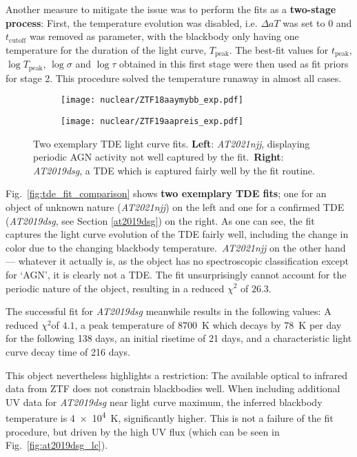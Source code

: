Another measure to mitigate the issue was to perform the fits as a \textbf{two-stage process}: First, the temperature evolution was disabled, i.e. $\Delta aT$ was set to $0$ and $t_\text{cutoff}$ was removed as parameter, with the blackbody only having one temperature for the duration of the light curve, $T_\text{peak}$. The best-fit values for $t_\text{peak}$, $\log T­­_\text{peak}$, $\log \sigma$ and $\log \tau$ obtained in this first stage were then used as fit priors for stage 2. This procedure solved the temperature runaway in almost all cases.

\begin{figure}[htb]
    \centering
    \begin{subfigure}[b]{0.49\textwidth}
        \centering
        \texttt{[image: nuclear/ZTF18aaymybb\_exp.pdf]}
    \end{subfigure}
    \begin{subfigure}[b]{0.49\textwidth}
        \centering
        \texttt{[image: nuclear/ZTF19aapreis\_exp.pdf]}
    \end{subfigure}
    \caption[Two exemplary TDE fits]{Two exemplary TDE light curve fits. \textbf{Left}: \textit{AT2021njj}, displaying periodic AGN activity not well captured by the fit.\ \textbf{Right}: \textit{AT2019dsg}, a TDE which is captured fairly well by the fit routine.}
\end{figure}

Fig.~\ref{fig:tde_fit_comparison} shows \textbf{two exemplary TDE fits}; one for an object of unknown nature (\textit{AT2021njj}) on the left and one for a confirmed TDE (\textit{AT2019dsg}, see Section \ref{at2019dsg}) on the right. As one can see, the fit captures the light curve evolution of the TDE fairly well, including the change in color due to the changing blackbody temperature.~\textit{AT2021njj} on the other hand --- whatever it actually is, as the object has no spectroscopic classification except for `AGN', it is clearly not a TDE. The fit unsurprisingly cannot account for the periodic nature of the object, resulting in a reduced $\chi^2$ of $26.3$.

The successful fit for \textit{AT2019dsg} meanwhile results in the following values: A reduced $\chi^2$of $4.1$, a peak temperature of \SI{8700}{\K} which decays by \SI{78}{\K} per day for the following 138 days, an initial risetime of 21 days, and a characteristic light curve decay time of 216 days.

This object nevertheless highlights a restriction: The available optical to infrared data from ZTF does not constrain blackbodies well. When including additional UV data for \textit{AT2019dsg} near light curve maximum, the inferred blackbody temperature is \SI{4e4}{\K}, significantly higher. This is not a failure of the fit procedure, but driven by the high UV flux (which can be seen in Fig.~\ref{fig:at2019dsg_lc}).

